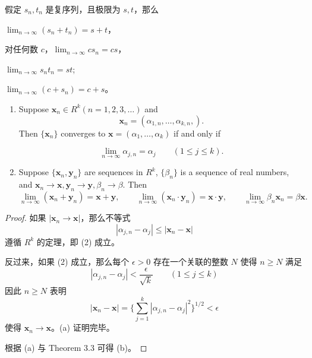 \documentclass[../poma-notes.tex]{subfiles}
\begin{document}
\begin{anote}
  假定 ${s_n}, {t_n}$ 是复序列，且极限为 $s, t$，那么
  \begin{enumerate*}[label=(\alph*)]
    \item $\lim_{n \to \infty}(s_n + t_n) = s + t$，
    \item 对任何数 $c$，$\lim_{n \to \infty} cs_n = cs$，
    \item $\lim_{n \to \infty} s_n t_n = st$;
    \item $\lim_{n \to \infty}(c + s_n) = c + s$。
  \end{enumerate*}
\end{anote}

\begin{theorem}
  \begin{enumerate}[label=(\alph*)]
    \item Suppose $\mathbf{x}_n \in R^k (n=1,2,3,\dots)$ and
          \[\mathbf{x}_n = (\alpha_{1,n},\dots,\alpha_{k,n},).\]
          Then $\{\mathbf{x}_n\}$ converges to $\mathbf{x}=(\alpha_1,\dots,\alpha_k)$ if and only if
          \begin{center}
            \begin{equation}
              \lim_{n \to \infty} \alpha_{j,n} = \alpha_j \qquad (1 \le j \le k).
            \end{equation}
          \end{center}
    \item Suppose $\{\mathbf{x}_n,\mathbf{y}_n\}$ are sequences in $R^k$, $\{\beta_n\}$ is a sequence of real numbers,
          and $\mathbf{x}_n \to \mathbf{x}, \mathbf{y}_n \to \mathbf{y}, \beta_n \to \beta$. Then
          \[
            \lim_{n \to \infty} (\mathbf{x}_n + \mathbf{y}_n) = \mathbf{x} + \mathbf{y}, \qquad
            \lim_{n \to \infty} (\mathbf{x}_n \cdot \mathbf{y}_n) = \mathbf{x} \cdot \mathbf{y} , \qquad
            \lim_{n \to \infty} \beta_n \mathbf{x}_n = \beta \mathbf{x}.
          \]
  \end{enumerate}
\end{theorem}

\begin{proof}
  如果 $|\mathbf{x}_n \to \mathbf{x}|$，那么不等式
  \[|\alpha_{j,n} - \alpha_j| \le |\mathbf{x}_n - \mathbf{x}|\]
  遵循 $R^k$ 的定理，即 (2) 成立。

  反过来，如果 (2) 成立，那么每个 $\epsilon > 0$ 存在一个关联的整数 $N$ 使得 $n \ge N$ 满足
  \[|\alpha_{j,n} - \alpha_j| < \frac{\epsilon}{\sqrt{k}} \qquad (1 \le j \le k)\]
  因此 $n \ge N$ 表明
  \[|\mathbf{x}_n - \mathbf{x}| = \biggl\{\sum_{j = 1}^{k} |\alpha_{j,n} - \alpha_j|^2\biggr\}^{1/2} < \epsilon\]
  使得 $\mathbf{x}_n \to \mathbf{x}$。(a) 证明完毕。

  根据 (a) 与 Theorem 3.3 可得 (b)。
\end{proof}
\end{document}

